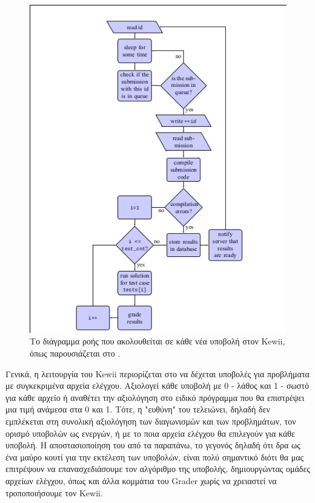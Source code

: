 \documentclass[diploma]{softlab-thesis}
\begin{document}
\begin{figure}
  \centering
  \includegraphics[scale=0.8,trim=4 4 4 4,clip]{Figures/graderflow.png}
  \caption[Ροή Kewii]{Το διάγραμμα ροής που ακολουθείται σε κάθε νέα υποβολή
  στον Kewii, όπως παρουσιάζεται στο \cite{Tsiamitros}.}
\end{figure}

\bigskip

Γενικά, η λειτουργία του Kewii περιορίζεται στο να δέχεται υποβολές για
προβλήματα με συγκεκριμένα αρχεία ελέγχου. Αξιολογεί κάθε υποβολή με 0 - λάθος
και 1 - σωστό για κάθε αρχείο ή αναθέτει την αξιολόγηση στο ειδικό πρόγραμμα
που θα επιστρέψει μια τιμή ανάμεσα στα 0 και 1. Τότε, η "ευθύνη" του τελειώνει,
δηλαδή δεν εμπλέκεται στη συνολική αξιολόγηση των διαγωνισμών και των
προβλημάτων, τον ορισμό υποβολών ως ενεργών, ή με το ποια αρχεία ελέγχου θα
επιλεγούν για κάθε υποβολή. Η αποστασιοποίηση του από τα παραπάνω, το γεγονός
δηλαδή ότι δρα ως ένα μαύρο κουτί για την εκτέλεση των υποβολών, είναι πολύ
σημαντικό διότι θα μας επιτρέψουν να επανασχεδιάσουμε τον αλγόριθμο της
υποβολής, δημιουργώντας ομάδες αρχείων ελέγχου, όπως και άλλα κομμάτια του
Grader χωρίς να χρειαστεί να τροποποιήσουμε τον Kewii.
\end{document}
